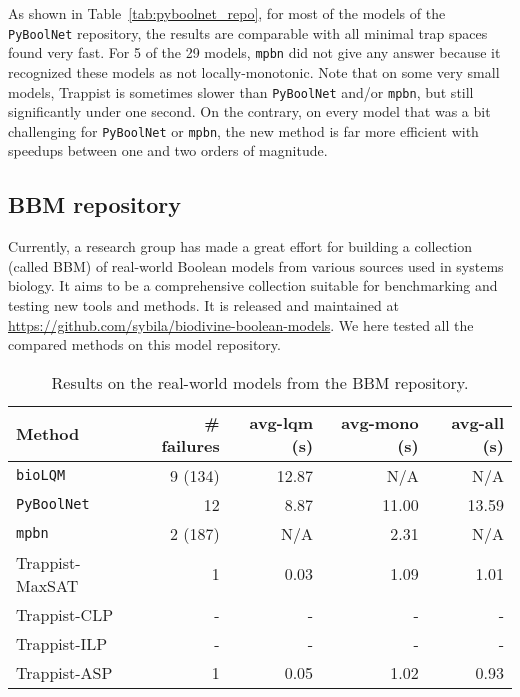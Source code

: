 \documentclass[preprint,12pt]{elsarticle}
\newcounter{rownumber}
\begin{document}
As shown in Table~\ref{tab:pyboolnet_repo}, for most of the models of the \texttt{PyBoolNet} repository, the results are comparable with all minimal trap spaces found very fast.
For 5 of the 29 models, \texttt{mpbn} did not give any answer because it recognized these models as not locally-monotonic.
Note that on some very small models, Trappist is sometimes slower than \texttt{PyBoolNet} and/or \texttt{mpbn}, but still significantly under one second.
On the contrary, on every model that was a bit challenging for \texttt{PyBoolNet} or \texttt{mpbn}, the new method is far more efficient with speedups between one and two orders of magnitude.

\subsection{BBM repository}

Currently, a research group has made a great effort for building a collection (called BBM) of real-world Boolean models from various sources used in systems biology.
It aims to be a comprehensive collection suitable for benchmarking and testing new tools and methods.
It is released and maintained at \url{https://github.com/sybila/biodivine-boolean-models}.
We here tested all the compared methods on this model repository.

\setlength{\tabcolsep}{4pt}
\begin{table}[!htb]
  \caption{Results on the real-world models from the BBM repository.}
  \centering%
  \label{tab:bbm_repo}
  \begin{tabular}{lrrrr}
    \toprule
    Method & \# failures & avg-lqm (s) & avg-mono (s) & avg-all (s) \\ \midrule
    \texttt{bioLQM} & 9 (134) & 12.87 & N/A & N/A \\
    \texttt{PyBoolNet} & 12 & 8.87 & 11.00 & 13.59 \\
    \texttt{mpbn} & 2 (187) & N/A & 2.31 & N/A \\
    Trappist-MaxSAT & 1 & 0.03 & 1.09 & 1.01 \\
    Trappist-CLP & - & - & - & - \\
    Trappist-ILP & - & - & - & - \\
    Trappist-ASP & 1 & 0.05 & 1.02 & 0.93 \\
    \bottomrule
  \end{tabular}
\end{table}
\setcounter{rownumber}{0}
\end{document}

